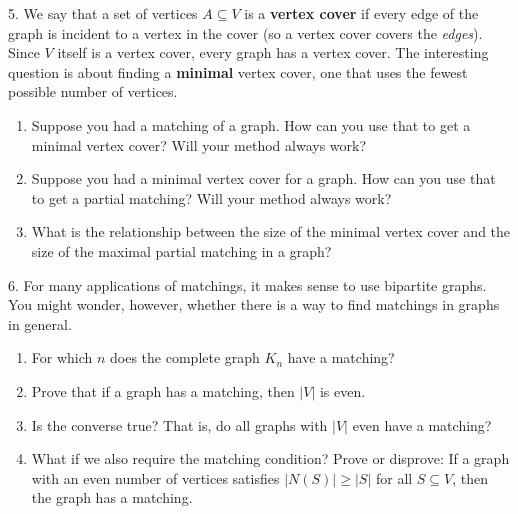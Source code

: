 \documentclass[10pt,]{book}
\newcommand{\terminology}[1]{\textbf{#1}}
\theoremstyle{plain}
\theoremstyle{definition}
\numberwithin{equation}{chapter}
\newcommand{\card}[1]{\left| #1 \right|}
\begin{document}
\begin{exerciselist}
\par\smallskip
\item[5.]\hypertarget{exercise-318}{}
        We say that a set of vertices \(A \subseteq V\) is a \terminology{vertex cover}  if every edge of the graph is incident to a vertex in the cover (so a vertex cover covers the \emph{edges}). Since \(V\) itself is a vertex cover, every graph has a vertex cover. The interesting question is about finding a \terminology{minimal} vertex cover, one that uses the fewest possible number of vertices.
        \leavevmode%
\begin{enumerate}[label=(\alph*)]
\item\hypertarget{li-815}{}Suppose you had a matching of a graph.  How can you use that to get a minimal vertex cover?  Will your method always work?%
\item\hypertarget{li-816}{}Suppose you had a minimal vertex cover for a graph.  How can you use that to get a partial matching?  Will your method always work?%
\item\hypertarget{li-817}{}What is the relationship between the size of the minimal vertex cover and the size of the maximal partial matching in a graph?%
\end{enumerate}

\par\smallskip
\item[6.]\hypertarget{exercise-319}{}
        For many applications of matchings, it makes sense to use bipartite graphs. You might wonder, however, whether there is a way to find matchings in graphs in general.
        \leavevmode%
\begin{enumerate}[label=(\alph*)]
\item\hypertarget{li-818}{}For which \(n\) does the complete graph \(K_n\) have a matching?%
\item\hypertarget{li-819}{}Prove that if a graph has a matching, then \(\card{V}\) is even.%
\item\hypertarget{li-820}{}Is the converse true?  That is, do all graphs with \(\card{V}\) even have a matching?%
\item\hypertarget{li-821}{}What if we also require the matching condition?  Prove or disprove: If a graph with an even number of vertices satisfies \(\card{N(S)} \ge \card{S}\) for all \(S \subseteq V\), then the graph has a matching.%
\end{enumerate}

\par\smallskip
\end{exerciselist}
\typeout{************************************************}
\typeout{************************************************}
\end{document}
